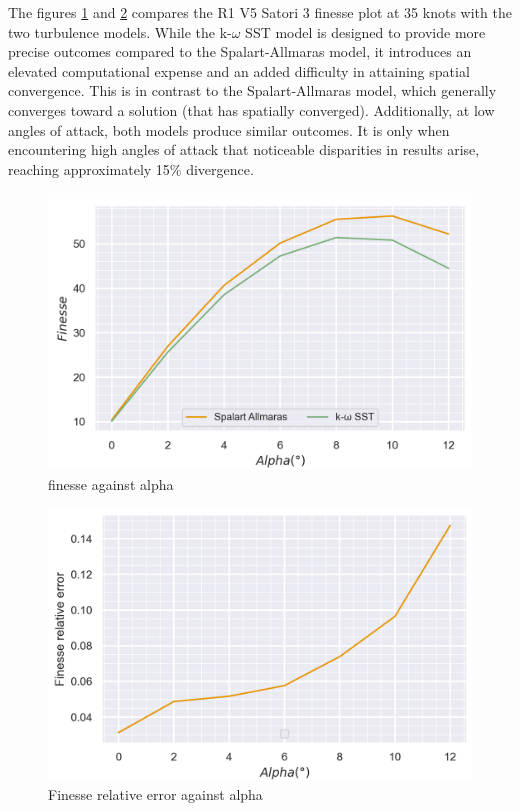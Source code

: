 The figures \ref{fig:polars comparison between turbulence models on the R1 V5 Satori 3} and \ref{fig:Finesse relative error between turbulence models} compares the R1 V5 Satori 3 finesse plot at 35 knots with the two turbulence models. While the k-$\omega$ SST model is designed to provide more precise outcomes compared to the Spalart-Allmaras model, it introduces an elevated computational expense and an added difficulty in attaining spatial convergence. This is in contrast to the Spalart-Allmaras model, which generally converges toward a solution (that has spatially converged). Additionally, at low angles of attack, both models produce similar outcomes. It is only when encountering high angles of attack that noticeable disparities in results arise, reaching approximately 15\% divergence.

\begin{figure}[H]
    \centering
    \includegraphics[width=0.75\linewidth]{figures/2D steady simulations/fluent/R1V5Satori3 Spalart Allmaras VS KWSST.png}
    \caption{finesse against alpha}
    \label{fig:polars comparison between turbulence models on the R1 V5 Satori 3}
\end{figure}

\begin{figure}[H]
    \centering
    \includegraphics[width=0.75\linewidth]{figures/2D steady simulations/fluent/finesse relative error turbulence model.png}
    \caption{Finesse relative error against alpha}
    \label{fig:Finesse relative error between turbulence models}
\end{figure}

